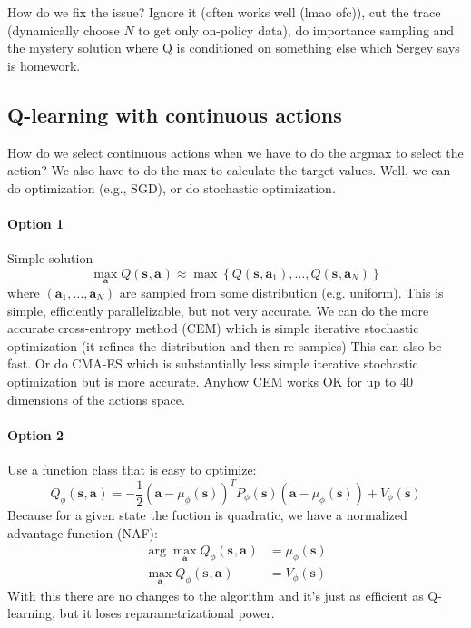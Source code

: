 \documentclass{report}
\newcommand{\argmax}{\arg\!\max}
\begin{document}
How do we fix the issue?
Ignore it (often works well (lmao ofc)), cut the trace (dynamically choose $N$ to get only on-policy data),
do importance sampling and the mystery solution where Q is conditioned on something else which Sergey says is homework.

\subsection{Q-learning with continuous actions}
How do we select continuous actions when we have to do the argmax to select the action?
We also have to do the max to calculate the target values.
Well, we can do optimization (e.g., SGD), or do stochastic optimization.
\paragraph{Option 1}
Simple solution
\begin{equation}
		\max_{\bm{a}} Q(\bm{s}_{}, \bm{a}_{}) \approx \max \left\{ Q(\bm{s}_{}, \bm{a}_{1}), \dots,Q(\bm{s}_{}, \bm{a}_{N})  \right\} 
\end{equation}
where $(\bm{a}_1, \dots, \bm{a}_N)$ are sampled from some distribution (e.g. uniform).
This is simple, efficiently parallelizable, but not very accurate.
We can do the more accurate cross-entropy method (CEM) which is simple iterative stochastic optimization (it refines the distribution and then re-samples)
This can also be fast.
Or do CMA-ES which is substantially less simple iterative stochastic optimization but is more accurate.
Anyhow CEM works OK for up to 40 dimensions of the actions space.

\paragraph{Option 2}
Use a function class that is easy to optimize:
\begin{equation}
		Q_\phi (\bm{s}_{}, \bm{a}_{}) = - \frac{1}{2} (\bm{a} - \mu_\phi(\bm{s}))^T P_\phi (\bm{s}) (\bm{a} - \mu_\phi(\bm{s})) + V_\phi (\bm{s})
\end{equation}
Because for a given state the fuction is quadratic, we have a normalized advantage function (NAF):
\begin{align}
		\argmax_{\bm{a}} Q_\phi (\bm{s}_{}, \bm{a}_{}) &= \mu_\phi(\bm{s}) \\
		\max_{\bm{a}} Q_\phi (\bm{s}_{}, \bm{a}_{}) &= V_\phi(\bm{s})
\end{align}
With this there are no changes to the algorithm and it's just as efficient as Q-learning,
but it loses reparametrizational power.
\end{document}
